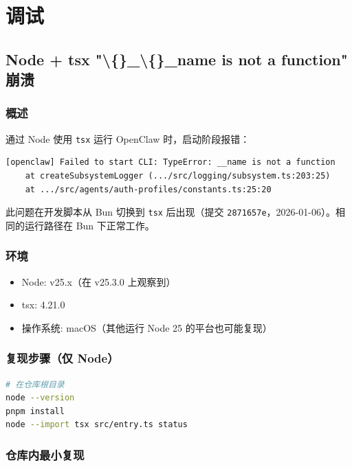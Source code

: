 \chapter{调试}

\section{Node + tsx "\textbackslash\{\}\_\textbackslash\{\}\_name is not a function" 崩溃}


\subsection{概述}


通过 Node 使用 \texttt{tsx} 运行 OpenClaw 时，启动阶段报错：

\begin{lstlisting}
[openclaw] Failed to start CLI: TypeError: __name is not a function
    at createSubsystemLogger (.../src/logging/subsystem.ts:203:25)
    at .../src/agents/auth-profiles/constants.ts:25:20
\end{lstlisting}


此问题在开发脚本从 Bun 切换到 \texttt{tsx} 后出现（提交 \texttt{2871657e}，2026-01-06）。相同的运行路径在 Bun 下正常工作。

\subsection{环境}


\begin{itemize}
  \item Node: v25.x（在 v25.3.0 上观察到）
  \item tsx: 4.21.0
  \item 操作系统: macOS（其他运行 Node 25 的平台也可能复现）
\end{itemize}


\subsection{复现步骤（仅 Node）}


\begin{lstlisting}[language=bash]
# 在仓库根目录
node --version
pnpm install
node --import tsx src/entry.ts status
\end{lstlisting}


\subsection{仓库内最小复现}


